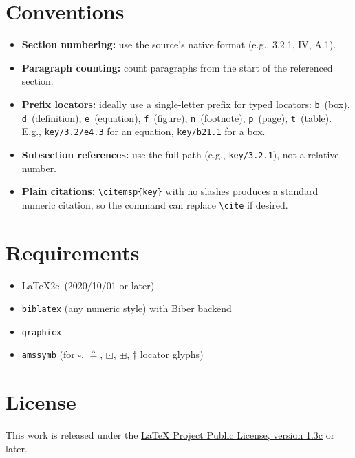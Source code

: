 \documentclass[11pt, a4paper]{article}
\newcommand{\pkg}[1]{\texttt{#1}}
\begin{document}
\section{Conventions}

\begin{itemize}[leftmargin=2em]
  \item \textbf{Section numbering:} use the source's native format (e.g., 3.2.1, IV, A.1).
  \item \textbf{Paragraph counting:} count paragraphs from the start of the referenced section.
  \item \textbf{Prefix locators:} ideally use a single-letter prefix for typed locators: \texttt{b}~(box), \texttt{d}~(definition), \texttt{e}~(equation), \texttt{f}~(figure), \texttt{n}~(footnote), \texttt{p}~(page), \texttt{t}~(table). E.g., \texttt{key/3.2/e4.3} for an equation, \texttt{key/b21.1} for a box.
  \item \textbf{Subsection references:} use the full path (e.g., \texttt{key/3.2.1}), not a relative number.
  \item \textbf{Plain citations:} \verb|\citemsp{key}| with no slashes produces a standard numeric citation, so the command can replace \verb|\cite| if desired.
\end{itemize}


\section{Requirements}

\begin{itemize}[leftmargin=2em]
  \item \LaTeX2e\ (2020/10/01 or later)
  \item \pkg{biblatex} (any numeric style) with Biber backend
  \item \pkg{graphicx}
  \item \pkg{amssymb} (for $\square$, $\triangleq$, $\boxdot$, $\boxplus$, $\dagger$ locator glyphs)
\end{itemize}

\section{License}

This work is released under the \href{https://www.latex-project.org/lppl/lppl-1-3c/}{LaTeX Project Public License, version 1.3c} or later.


\printbibliography
\end{document}
